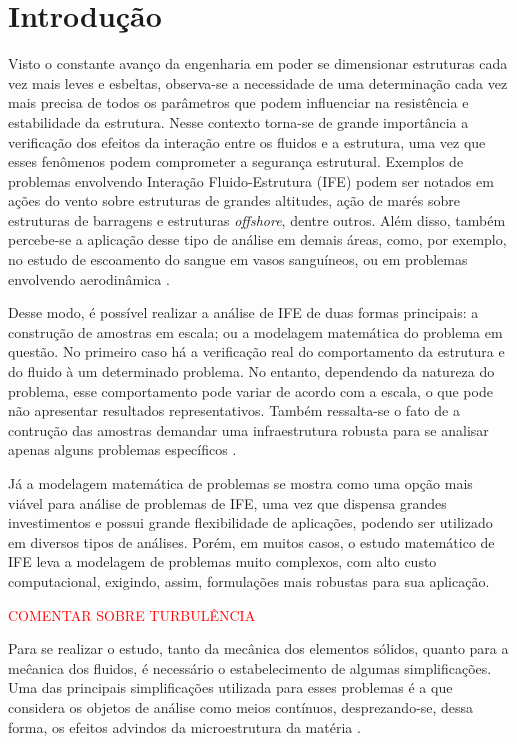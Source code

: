 \documentclass[_ArquivoPrincipal.tex]{subfiles}
\begin{document}
\chapter{Introdução}

Visto o constante avanço da engenharia em poder se dimensionar estruturas cada vez mais leves e esbeltas, observa-se a necessidade de uma determinação cada vez mais precisa de todos os parâmetros que podem influenciar na resistência e estabilidade da estrutura. Nesse contexto torna-se de grande importância a verificação dos efeitos da interação entre os fluidos e a estrutura, uma vez que esses fenômenos podem comprometer a segurança estrutural. Exemplos de problemas envolvendo Interação Fluido-Estrutura (IFE) podem ser notados em ações do vento sobre estruturas de grandes altitudes, ação de marés sobre estruturas de barragens e estruturas \textit{offshore}, dentre outros. Além disso, também percebe-se a aplicação desse tipo de análise em demais áreas, como, por exemplo, no estudo de escoamento do sangue em vasos sanguíneos, ou em problemas envolvendo aerodinâmica \cite{sanches2014fluid, fernandes2020tecnica}.

Desse modo, é possível realizar a análise de IFE de duas formas principais: a construção de amostras em escala; ou a modelagem matemática do problema em questão. No primeiro caso há a verificação real do comportamento da estrutura e do fluido à um determinado problema. No entanto, dependendo da natureza do problema, esse comportamento pode variar de acordo com a escala, o que pode não apresentar resultados representativos. Também ressalta-se o fato de a contrução das amostras demandar uma infraestrutura robusta para se analisar apenas alguns problemas específicos \cite{fernandes2020tecnica}.

Já a modelagem matemática de problemas se mostra como uma opção mais viável para análise de problemas de IFE, uma vez que dispensa grandes investimentos e possui grande flexibilidade de aplicações, podendo ser utilizado em diversos tipos de análises. Porém, em muitos casos, o estudo matemático de IFE leva a modelagem de problemas muito complexos, com alto custo computacional, exigindo, assim, formulações mais robustas para sua aplicação.

\textcolor{red}{COMENTAR SOBRE TURBULÊNCIA}

Para se realizar o estudo, tanto da mecânica dos elementos sólidos, quanto para a meĉanica dos fluidos, é necessário o estabelecimento de algumas simplificações. Uma das principais simplificações utilizada para esses problemas é a que considera os objetos de análise como meios contínuos, desprezando-se, dessa forma, os efeitos advindos da microestrutura da matéria \cite{lai2009introduction, mase2009continuum}.
\end{document}
